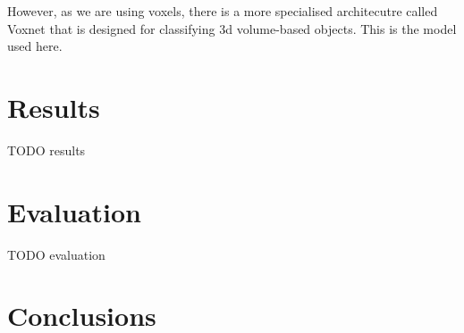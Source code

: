 \documentclass[10pt,a4paper]{article}
\begin{document}
            However, as we are using voxels, there is a more specialised architecutre called Voxnet that is designed for classifying
            3d volume-based objects. This is the model used here.
\section{Results}
    TODO results
\section{Evaluation}
    TODO evaluation


\section{Conclusions}




\end{document}
